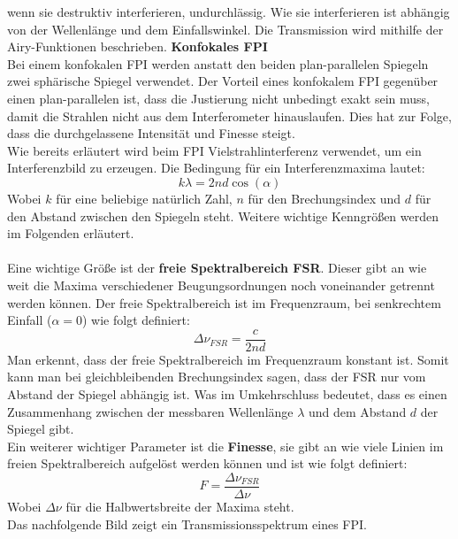 wenn sie destruktiv interferieren, undurchlässig. Wie sie interferieren ist abhängig von 
der Wellenlänge und dem Einfallswinkel. Die Transmission wird mithilfe der Airy-Funktionen beschrieben. \citep[vgl.][]{fpi}
\newpage
\textbf{Konfokales FPI}\\
Bei einem konfokalen FPI werden anstatt den beiden plan-parallelen Spiegeln zwei sphärische Spiegel verwendet.
Der Vorteil eines konfokalem FPI gegenüber einen plan-parallelen ist, dass die Justierung nicht unbedingt exakt sein muss, damit die 
Strahlen nicht aus dem Interferometer hinauslaufen. Dies hat zur Folge, dass die durchgelassene Intensität und Finesse steigt.\\
Wie bereits erläutert wird beim FPI Vielstrahlinterferenz verwendet, um ein Interferenzbild zu erzeugen. 
Die Bedingung für ein Interferenzmaxima lautet:
\begin{equation}
    k \lambda = 2nd \cos(\alpha)
\end{equation}
Wobei $k$ für eine beliebige natürlich Zahl, $n$ für den Brechungsindex und $d$ für den Abstand zwischen den Spiegeln steht.
Weitere wichtige Kenngrößen werden im Folgenden erläutert.\\\\
Eine wichtige Größe ist der \textbf{freie Spektralbereich FSR}. Dieser gibt an wie weit die Maxima verschiedener Beugungsordnungen
noch voneinander getrennt werden können. 
Der freie Spektralbereich ist im Frequenzraum, bei senkrechtem Einfall ($\alpha = 0$) wie folgt definiert:
\begin{equation}
    \Delta \nu_{FSR} = \frac{c}{2 n d }
\end{equation}
Man erkennt, dass der freie Spektralbereich im Frequenzraum konstant ist. Somit kann man bei gleichbleibenden Brechungsindex
sagen, dass der FSR nur vom Abstand der Spiegel abhängig ist. Was im Umkehrschluss bedeutet, dass es einen Zusammenhang
zwischen der messbaren Wellenlänge $\lambda$ 
und dem Abstand $d$ der Spiegel gibt.\\
Ein weiterer wichtiger Parameter ist die \textbf{Finesse}, sie gibt an wie viele Linien im freien Spektralbereich aufgelöst werden können
und ist wie folgt definiert:
\begin{equation}
    F = \frac{\Delta \nu_{FSR}}{\Delta \nu}
\end{equation}
Wobei $\Delta \nu$ für die Halbwertsbreite der Maxima steht. \cite[vgl.][]{fpi2}\\
Das nachfolgende Bild zeigt ein Transmissionsspektrum eines FPI.
